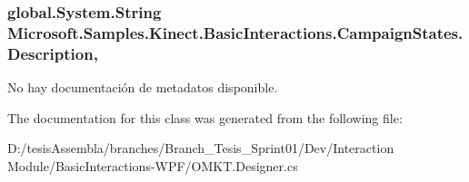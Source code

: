 \hypertarget{class_microsoft_1_1_samples_1_1_kinect_1_1_basic_interactions_1_1_campaign_states_a20844767c8e82f9ee3ebb462c8164c0a}{
\subsubsection[{Description}]{\setlength{\rightskip}{0pt plus 5cm}global.\-System.\-String Microsoft.\-Samples.\-Kinect.\-Basic\-Interactions.\-Campaign\-States.\-Description\hspace{0.3cm}{\ttfamily [get]}, {\ttfamily [set]}}}\label{class_microsoft_1_1_samples_1_1_kinect_1_1_basic_interactions_1_1_campaign_states_a20844767c8e82f9ee3ebb462c8164c0a}


No hay documentación de metadatos disponible. 



The documentation for this class was generated from the following file\-:\begin{DoxyCompactItemize}
\item 
D\-:/tesis\-Assembla/branches/\-Branch\-\_\-\-Tesis\-\_\-\-Sprint01/\-Dev/\-Interaction Module/\-Basic\-Interactions-\/\-W\-P\-F/O\-M\-K\-T.\-Designer.\-cs\end{DoxyCompactItemize}

